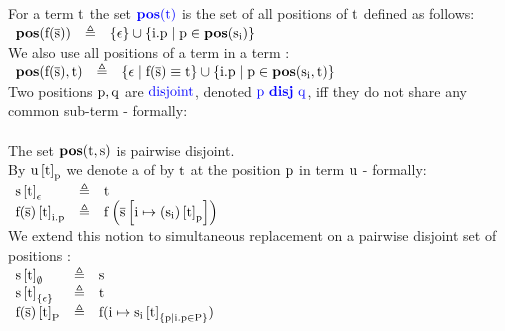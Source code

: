 \noindent
For a term $\mathrm{t}$ the set $\textcolor{blue}{\mathrm{\mathrm{\mathbf{pos}(t)}}}$ is the set of all positions of $\mathrm{t}$ defined as follows:\\
$
\begin{array}{lll}
	\mathrm{\mathbf{pos}(\mathrm{f}(\mathrm{\overline{s}}))} & \triangleq & \left\{\mathrm{\epsilon}\right\} \cup \left\{\mathrm{i.p \mid p \in \mathrm{\mathbf{pos}(s_i)}}\right\} \\
\end{array}
$\\
We also use all positions of a term  in a term :\\
$
\begin{array}{lll}
	\mathrm{\mathbf{pos}(\mathrm{f}(\mathrm{\overline{s}}),t)} & \triangleq & \left\{\mathrm{\epsilon \mid \mathrm{f}(\mathrm{\overline{s}})\equiv t}\right\} \cup \left\{\mathrm{i.p \mid p \in \mathrm{\mathbf{pos}(s_i,t)}}\right\} \\
\end{array}
$\\
Two positions $\mathrm{p,q}$ are $\textcolor{blue}{\mbox{disjoint}}$, denoted $\textcolor{blue}{\mathrm{p \mathbf{~disj~} q}}$, iff they do not share any common sub-term - formally:\\
\\
The set $\mathrm{\mathbf{pos}(t,s)}$ is pairwise disjoint.\\
By $\mathrm{u}\left[\mathrm{t}\right]_{\mathrm{p}}$ we denote a  of  by $\mathrm{t}$ at the position $\mathrm{p}$ in term $\mathrm{u}$ - formally:\\
$
\begin{array}{lll}
	\mathrm{s        }\left[\mathrm{t}\right]_{\mathrm{\epsilon}} & \triangleq & \mathrm{t} \\
	\mathrm{\mathrm{f}(\mathrm{\overline{s}})}\left[\mathrm{t}\right]_{\mathrm{i.p      }} & \triangleq & \mathrm{f}\left(\mathrm{\mathrm{\overline{s}}}\left[\mathrm{i} \mapsto \mathrm{(\mathrm{s}_{\mathrm{i}})}\left[\mathrm{t}\right]_{\mathrm{p}} \right]\right) \\
\end{array}
$\\
We extend this notion to simultaneous replacement on a pairwise disjoint set of positions :\\
$
\begin{array}{lll}
	\mathrm{s        }\left[\mathrm{t}\right]_{\mathrm{\emptyset}}     & \triangleq & \mathrm{s} \\
	\mathrm{s        }\left[\mathrm{t}\right]_{\mathrm{\left\{\mathrm{\epsilon}\right\}}} & \triangleq & \mathrm{t} \\
	\mathrm{\mathrm{f}(\mathrm{\overline{s}})}\left[\mathrm{t}\right]_{\mathrm{P            }} & \triangleq & \mathrm{f(i \mapsto \mathrm{s_i}\left[\mathrm{t}\right]_{\mathrm{\left\{\mathrm{p \mid i.p \in P}\right\}}})} \\
\end{array}
$

\bigskip


